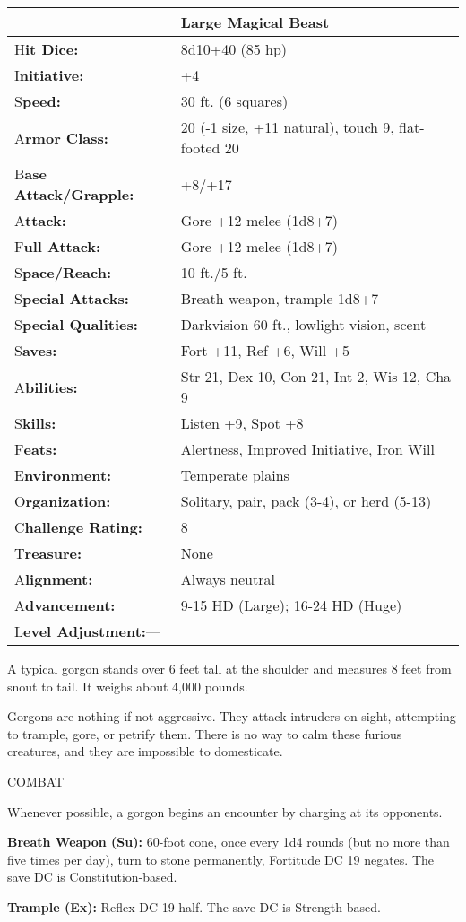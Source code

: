 \documentclass{article}
\begin{document}
\begin{tabular}{|>{\raggedright}p{91pt}|>{\raggedright}p{191pt}|}
\hline
  & Large Magical Beast\tabularnewline
\hline
H\textbf{it Dice:} & 8d10+40 (85 hp)\tabularnewline
\hline
I\textbf{nitiative:} & +4\tabularnewline
\hline
S\textbf{peed:} & 30 ft. (6 squares)\tabularnewline
\hline
A\textbf{rmor Class:} & 20 (-1 size, +11 natural), touch 9, flat-footed 20\tabularnewline
\hline
B\textbf{ase Attack/Grapple:} & +8/+17\tabularnewline
\hline
A\textbf{ttack:} & Gore +12 melee (1d8+7)\tabularnewline
\hline
F\textbf{ull Attack:} & Gore +12 melee (1d8+7)\tabularnewline
\hline
S\textbf{pace/Reach:} & 10 ft./5 ft.\tabularnewline
\hline
S\textbf{pecial Attacks:} & Breath weapon, trample 1d8+7\tabularnewline
\hline
S\textbf{pecial Qualities:} & Darkvision 60 ft., lowlight vision, scent\tabularnewline
\hline
S\textbf{aves:} & Fort +11, Ref +6, Will +5\tabularnewline
\hline
A\textbf{bilities:} & Str 21, Dex 10, Con 21, Int 2, Wis 12, Cha 9\tabularnewline
\hline
S\textbf{kills:} & Listen +9, Spot +8\tabularnewline
\hline
F\textbf{eats:} & Alertness, Improved Initiative, Iron Will\tabularnewline
\hline
E\textbf{nvironment:} & Temperate plains\tabularnewline
\hline
O\textbf{rganization:} & Solitary, pair, pack (3-4), or herd (5-13)\tabularnewline
\hline
C\textbf{hallenge Rating:} & 8\tabularnewline
\hline
T\textbf{reasure:} & None\tabularnewline
\hline
A\textbf{lignment:} & Always neutral\tabularnewline
\hline
A\textbf{dvancement:} & 9-15 HD (Large); 16-24 HD (Huge)\tabularnewline
\hline
L\textbf{evel Adjustment:}--- & \tabularnewline
\hline
\end{tabular}

A typical gorgon stands over 6 feet tall at the shoulder and measures 8 feet from 
snout to tail. It weighs about 4,000 pounds.

Gorgons are nothing if not aggressive. They attack intruders on sight, attempting 
to trample, gore, or petrify them. There is no way to calm these furious creatures, 
and they are impossible to domesticate.

COMBAT

Whenever possible, a gorgon begins an encounter by charging at its opponents.

\textbf{Breath Weapon (Su):} 60-foot cone, once every 1d4 rounds (but no more than 
five times per day), turn to stone permanently, Fortitude DC 19 negates. The save 
DC is Constitution-based. 

\textbf{Trample (Ex):} Reflex DC 19 half. The save DC is Strength-based.
\end{document}
